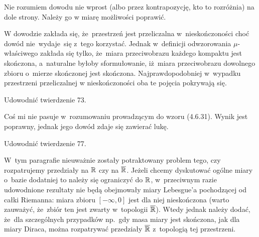 \documentclass[a4paper,11pt]{article}
\numberwithin{equation}{section}
\begin{document}
\vspace{\spaceFour}



\start {} Nie rozumiem dowodu nie wprost (albo przez
kontrapozycję, kto to rozróżnia) na dole strony. Należy go w miarę
możliwości poprawić.

\vspace{\spaceFour}



\start {} W dowodzie zakłada się, że~przestrzeń jest
przeliczalna w~nieskończoności choć dowód nie~wydaje~się z~tego
korzystać. Jednak w~definicji odwzorowania $\mu$-właściwego
zakłada się tylko, że~miara przeciwobrazu każdego kompaktu jest
skończona, a~naturalne byłoby sformułowanie, iż~miara przeciwobrazu
dowolnego zbioru o~mierze skończonej jest skończona.
Najprawdopodobniej w~wypadku przestrzeni przeliczalnej w
nieskończoności oba te pojęcia pokrywają się.

\vspace{\spaceFour}



\start {} Udowodnić twierdzenie 73.

\vspace{\spaceFour}



\start {} Coś mi nie pasuje w~rozumowaniu prowadzącym do wzoru
(4.6.31). Wynik jest poprawny, jednak jego dowód zdaje się zawierać
lukę.

\vspace{\spaceFour}



\start {} Udowodnić twierdzenie 77.

\vspace{\spaceFour}



\start {} W~tym paragrafie nieuważnie zostały potraktowany
problem tego, czy rozpatrujemy przedziały na $\mathbb{R}$ czy na
$\overline{\mathbb{R}}$. Jeżeli chcemy dyskutować ogólne miary o~bazie
dodatniej to należy się ograniczyć do $\mathbb{R}$, w~przeciwnym razie
udowodnione rezultaty nie będą obejmowały miary Lebesgue'a pochodzącej
od całki Riemanna: miara zbioru $[ -\infty, 0 ]$ jest dla niej
nieskończona (warto zauważyć, że~zbiór ten jest zwarty w~topologii
$\overline{\mathbb{R}}$). Wtedy jednak należy dodać, że~dla szczególnych
przypadków np.~gdy masa miary jest skończona, jak dla miary Diraca,
można rozpatrywać przedziały $\overline{\mathbb{R}}$ z~topologią tej
przestrzeni.
\end{document}

